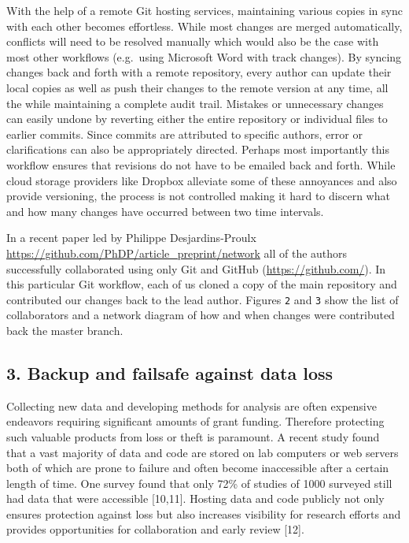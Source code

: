 \documentclass[]{article}
\begin{document}
With the help of a remote Git hosting services, maintaining various
copies in sync with each other becomes effortless. While most changes
are merged automatically, conflicts will need to be resolved manually
which would also be the case with most other workflows (e.g.~using
Microsoft Word with track changes). By syncing changes back and forth
with a remote repository, every author can update their local copies as
well as push their changes to the remote version at any time, all the
while maintaining a complete audit trail. Mistakes or unnecessary
changes can easily undone by reverting either the entire repository or
individual files to earlier commits. Since commits are attributed to
specific authors, error or clarifications can also be appropriately
directed. Perhaps most importantly this workflow ensures that revisions
do not have to be emailed back and forth. While cloud storage providers
like Dropbox alleviate some of these annoyances and also provide
versioning, the process is not controlled making it hard to discern what
and how many changes have occurred between two time intervals.

In a recent paper led by Philippe Desjardins-Proulx
\url{https://github.com/PhDP/article_preprint/network} all of the
authors successfully collaborated using only Git and GitHub
(\href{{[}@Vink2012b{]}}{https://github.com/}). In this particular Git
workflow, each of us cloned a copy of the main repository and
contributed our changes back to the lead author. Figures \texttt{2} and
\texttt{3} show the list of collaborators and a network diagram of how
and when changes were contributed back the master branch.

\subsection{3. Backup and failsafe against data loss}

Collecting new data and developing methods for analysis are often
expensive endeavors requiring significant amounts of grant funding.
Therefore protecting such valuable products from loss or theft is
paramount. A recent study found that a vast majority of data and code
are stored on lab computers or web servers both of which are prone to
failure and often become inaccessible after a certain length of time.
One survey found that only 72\% of studies of 1000 surveyed still had
data that were accessible {[}10,11{]}. Hosting data and code publicly
not only ensures protection against loss but also increases visibility
for research efforts and provides opportunities for collaboration and
early review {[}12{]}.
\end{document}
